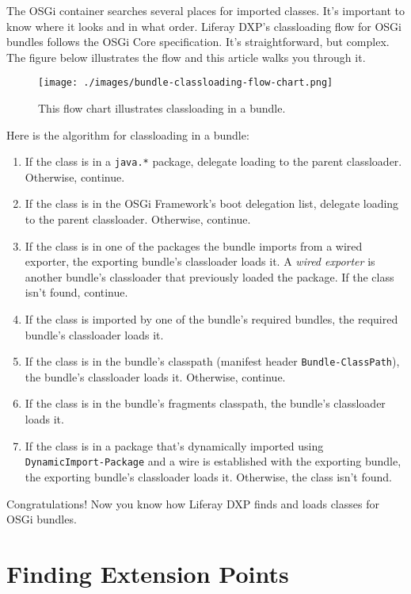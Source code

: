 The OSGi container searches several places for imported classes. It's
important to know where it looks and in what order. Liferay DXP's
classloading flow for OSGi bundles follows the OSGi Core specification.
It's straightforward, but complex. The figure below illustrates the flow
and this article walks you through it.

\begin{figure}
\centering
\texttt{[image: ./images/bundle-classloading-flow-chart.png]}
\caption{This flow chart illustrates classloading in a bundle.}
\end{figure}

Here is the algorithm for classloading in a bundle:

\begin{enumerate}
\def\labelenumi{\arabic{enumi}.}
\item
  If the class is in a \texttt{java.*} package, delegate loading to the
  parent classloader. Otherwise, continue.
\item
  If the class is in the OSGi Framework's boot delegation list, delegate
  loading to the parent classloader. Otherwise, continue.
\item
  If the class is in one of the packages the bundle imports from a wired
  exporter, the exporting bundle's classloader loads it. A \emph{wired
  exporter} is another bundle's classloader that previously loaded the
  package. If the class isn't found, continue.
\item
  If the class is imported by one of the bundle's required bundles, the
  required bundle's classloader loads it.
\item
  If the class is in the bundle's classpath (manifest header
  \texttt{Bundle-ClassPath}), the bundle's classloader loads it.
  Otherwise, continue.
\item
  If the class is in the bundle's fragments classpath, the bundle's
  classloader loads it.
\item
  If the class is in a package that's dynamically imported using
  \texttt{DynamicImport-Package} and a wire is established with the
  exporting bundle, the exporting bundle's classloader loads it.
  Otherwise, the class isn't found.
\end{enumerate}

Congratulations! Now you know how Liferay DXP finds and loads classes
for OSGi bundles.

\chapter{Finding Extension Points}\label{finding-extension-points}

